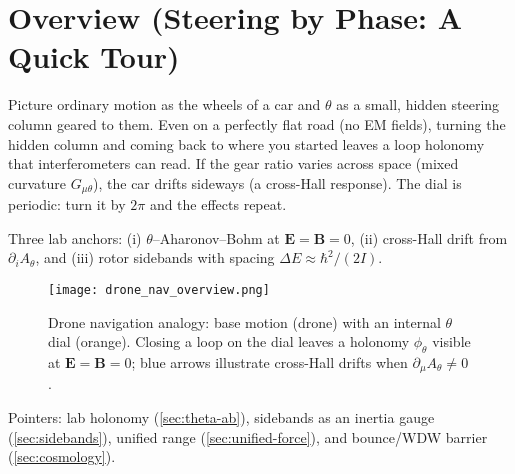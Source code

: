 \section{Overview (Steering by Phase: A Quick Tour)}\label{sec:overview}

Picture ordinary motion as the wheels of a car and $\theta$ as a small, hidden steering column geared to them. Even on a perfectly flat road (no EM fields), turning the hidden column and coming back to where you started leaves a loop holonomy that interferometers can read. If the gear ratio varies across space (mixed curvature $G_{\mu\theta}$), the car drifts sideways (a cross-Hall response). The dial is periodic: turn it by $2\pi$ and the effects repeat.

Three lab anchors: (i) $\theta$--Aharonov--Bohm at $\mathbf E=\mathbf B=0$, (ii) cross-Hall drift from $\partial_i A_\theta$, and (iii) rotor sidebands with spacing $\Delta E\approx\hbar^2/(2I)$.

\begin{figure}[h]
  \centering
  \texttt{[image: drone\_nav\_overview.png]}
  \caption{Drone navigation analogy: base motion (drone) with an internal $\theta$ dial (orange). Closing a loop on the dial leaves a holonomy $\phi_\theta$ visible at $\mathbf E=\mathbf B=0$; blue arrows illustrate cross-Hall drifts when $\partial_\mu A_\theta\neq 0$.}
  \label{fig:drone-analogy}
\end{figure}

Pointers: lab holonomy (\cref{sec:theta-ab}), sidebands as an inertia gauge (\cref{sec:sidebands}), unified range (\cref{sec:unified-force}), and bounce/WDW barrier (\cref{sec:cosmology}).
